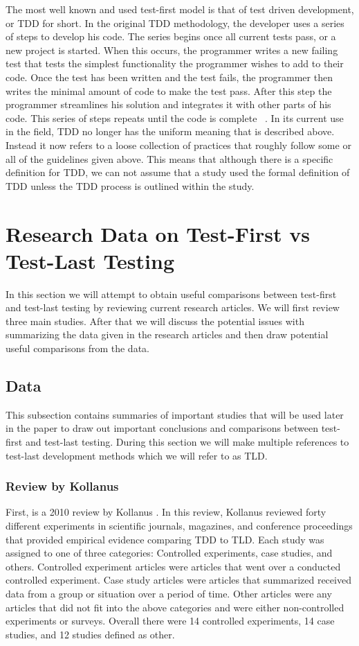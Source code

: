 \documentclass{sig-alternate}
\begin{document}
The most well known and used test-first model is that of test driven development, or TDD for short.  In the original TDD methodology, the developer uses a series of steps to develop his code.  The series begins once all current tests pass, or a new project is started.  When this occurs, the programmer writes a new failing test that tests the simplest functionality the programmer wishes to add to their code.  Once the test has been written and the test fails, the programmer then writes the minimal amount of code to make the test pass.  After this step the programmer streamlines his solution and integrates it with other parts of his code.  This series of steps repeats until the code is complete ~\cite{Hammond:2012}.  In its current use in the field, TDD no longer has the uniform meaning that is described above.  Instead it now refers to a loose collection of practices that roughly follow some or all of the guidelines given above.  This means that although there is a specific definition for TDD, we can not assume that a study used the formal definition of TDD unless the TDD process is outlined within the study. 

\section{Research Data on Test-First vs Test-Last Testing}
In this section we will attempt to obtain useful comparisons between test-first and test-last testing by reviewing current research articles. We will first review three main studies.  After that we will discuss the potential issues with summarizing the data given in the research articles and then draw potential useful comparisons from the data. 

\subsection{Data}

This subsection contains summaries of important studies that will be used later in the paper to draw out important conclusions and comparisons between test-first and test-last testing.  During this section we will make multiple references to test-last development methods which we will refer to as TLD.

\subsubsection{Review by Kollanus}

First, is a 2010 review by Kollanus \cite{Kollanus:2010}.  In this review, Kollanus reviewed forty different experiments in scientific journals, magazines, and conference proceedings that provided empirical evidence comparing TDD  to TLD.  Each study was assigned to one of three categories: Controlled experiments, case studies, and others.  Controlled experiment articles were articles that went over a conducted controlled experiment.  Case study articles were articles that summarized received data from a group or situation over a period of time.  Other articles were any articles that did not fit into the above categories and were either non-controlled experiments or surveys.  Overall there were 14 controlled experiments, 14 case studies, and 12 studies defined as other.  
\end{document}
